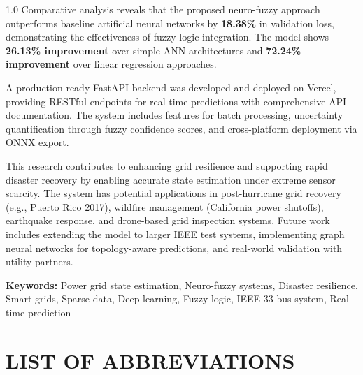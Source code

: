 \documentclass[12pt,a4paper]{report}
\begin{document}
\begin{spacing}{1.0}
Comparative analysis reveals that the proposed neuro-fuzzy approach outperforms baseline artificial neural networks by \textbf{18.38\%} in validation loss, demonstrating the effectiveness of fuzzy logic integration. The model shows \textbf{26.13\% improvement} over simple ANN architectures and \textbf{72.24\% improvement} over linear regression approaches.

A production-ready FastAPI backend was developed and deployed on Vercel, providing RESTful endpoints for real-time predictions with comprehensive API documentation. The system includes features for batch processing, uncertainty quantification through fuzzy confidence scores, and cross-platform deployment via ONNX export.

This research contributes to enhancing grid resilience and supporting rapid disaster recovery by enabling accurate state estimation under extreme sensor scarcity. The system has potential applications in post-hurricane grid recovery (e.g., Puerto Rico 2017), wildfire management (California power shutoffs), earthquake response, and drone-based grid inspection systems. Future work includes extending the model to larger IEEE test systems, implementing graph neural networks for topology-aware predictions, and real-world validation with utility partners.

\textbf{Keywords:} Power grid state estimation, Neuro-fuzzy systems, Disaster resilience, Smart grids, Sparse data, Deep learning, Fuzzy logic, IEEE 33-bus system, Real-time prediction

\end{spacing}

\newpage

\tableofcontents

\listoffigures

\listoftables

\chapter*{LIST OF ABBREVIATIONS}
\end{document}
